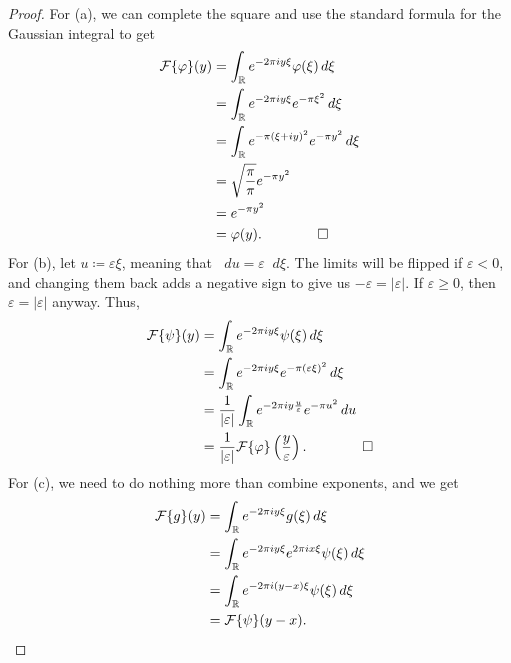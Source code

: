 \documentclass[a4paper]{article}
\newcommand*\diff{\mathop{}\!d} %
\newcommand{\R}{\mathbb{R}}
\theoremstyle{definition}
\begin{document}
\begin{proof}
    For (a), we can complete the square and use the standard formula for the Gaussian integral to get
    \begin{align*}
        \mathcal{F}\{\varphi\}(y) & = \int_\R e^{-2\pi i y \xi} \varphi(\xi) \diff \xi   \\
                                  & = \int_\R e^{-2\pi i y \xi} e^{-\pi \xi^2} \diff \xi \\
                                  & = \int_\R e^{-\pi (\xi+iy)^2} e^{-\pi y^2} \diff \xi \\
                                  & = \sqrt{\frac{\pi}{\pi}} e^{-\pi y^2}                \\
                                  & = e^{-\pi y^2}                                       \\
                                  & = \varphi (y). \qquad \qed
    \end{align*}
    For (b), let $u \coloneq \varepsilon \xi$, meaning that $\diff u = \varepsilon \diff \xi$.
    The limits will be flipped if $\varepsilon < 0$, and changing them back adds a negative sign to give us $-\varepsilon = \lvert \varepsilon \rvert$.
    If $\varepsilon \geq 0$, then $\varepsilon = \lvert \varepsilon \rvert$ anyway.
    Thus,
    \begin{align*}
        \mathcal{F}\{\psi\}(y) & = \int_\R e^{-2\pi i y \xi} \psi(\xi) \diff \xi                                                             \\
                               & = \int_\R e^{-2\pi i y \xi} e^{-\pi (\varepsilon \xi)^2} \diff \xi                                          \\
                               & = \frac{1}{\lvert \varepsilon \rvert} \int_\R e^{-2\pi i y \frac{u}{\varepsilon}} e^{-\pi u^2} \diff u      \\
                               & = \frac{1}{\lvert \varepsilon \rvert} \mathcal{F}\{\varphi\}\left(\frac{y}{\varepsilon}\right). \qquad \qed
    \end{align*}
    For (c), we need to do nothing more than combine exponents, and we get
    \begin{align*}
        \mathcal{F}\{g\}(y) & = \int_\R e^{-2\pi i y \xi} g(\xi) \diff \xi                     \\
                            & = \int_\R e^{-2\pi i y \xi} e^{2\pi i x \xi} \psi(\xi) \diff \xi \\
                            & = \int_\R e^{-2\pi i (y-x) \xi} \psi(\xi)\diff \xi               \\
                            & = \mathcal{F}\{\psi\}(y-x). \qedhere
    \end{align*}
\end{proof}
\end{document}
